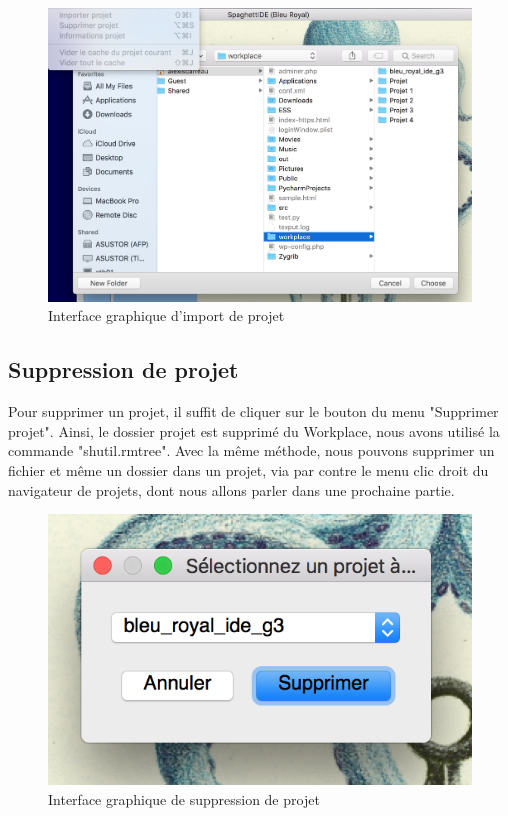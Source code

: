\documentclass[a4paper,12pt]{article}
\begin{document}
\begin{figure}[h!]
			\begin{center}
				\includegraphics[scale=0.4]{images/imgs_projet/import.png}
				\caption{Interface graphique d'import de projet}
			\end{center}
		\end{figure}
		
\subsection{Suppression de projet}

Pour supprimer un projet, il suffit de cliquer sur le bouton du menu "Supprimer projet". Ainsi, le dossier projet est supprimé du Workplace, nous avons utilisé la commande "shutil.rmtree". Avec la même méthode, nous pouvons supprimer un fichier et même un dossier dans un projet, via par contre le menu clic droit du navigateur de projets, dont nous allons parler dans une prochaine partie.

\begin{figure}[h!]
			\begin{center}
				\includegraphics[scale=0.5]{images/imgs_projet/supp_project.png}
				\caption{Interface graphique de suppression de projet}
			\end{center}
		\end{figure}
\end{document}
